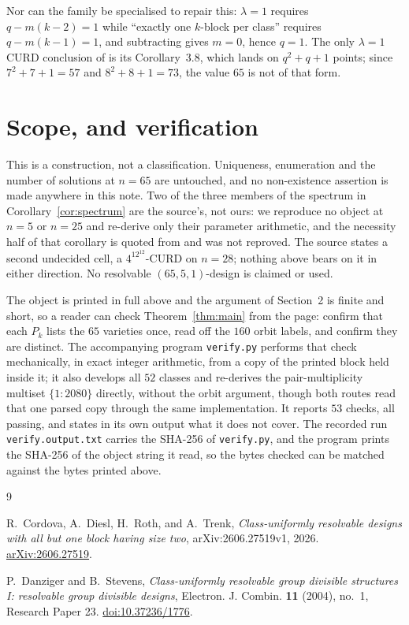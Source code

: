 \documentclass[11pt]{amsart}
\theoremstyle{remark}
\begin{document}
\noindent
Nor can the family be specialised to repair this: $\lambda=1$ requires
$q-m(k-2)=1$ while ``exactly one $k$-block per class'' requires
$q-m(k-1)=1$, and subtracting gives $m=0$, hence $q=1$. The only
$\lambda=1$ CURD conclusion of \cite{DaSt04} is its Corollary~3.8, which lands
on $q^2+q+1$ points; since $7^2+7+1=57$ and $8^2+8+1=73$, the value $65$ is not
of that form.

\section{Scope, and verification}

This is a construction, not a classification. Uniqueness, enumeration and the
number of solutions at $n=65$ are untouched, and no non-existence assertion is
made anywhere in this note. Two of the three members of the spectrum in
Corollary~\ref{cor:spectrum} are the source's, not ours: we reproduce no object
at $n=5$ or $n=25$ and re-derive only their parameter arithmetic, and the
necessity half of that corollary is quoted from \cite{CDRT} and was not
reproved. The source states a second undecided cell, a $4^12^{12}$-CURD on
$n=28$; nothing above bears on it in either direction. No resolvable
$(65,5,1)$-design is claimed or used.

The object is printed in full above and the argument of Section~2 is finite and
short, so a reader can check Theorem~\ref{thm:main} from the page: confirm that
each $P_k$ lists the $65$ varieties once, read off the $160$ orbit labels, and
confirm they are distinct. The accompanying program \texttt{verify.py} performs
that check mechanically, in exact integer arithmetic, from a copy of the printed
block held inside it; it also develops all $52$ classes and re-derives the
pair-multiplicity multiset $\{1{:}2080\}$ directly, without the orbit argument,
though both routes read that one parsed copy through the same implementation. It
reports $53$ checks, all passing, and states in its own output what it does not
cover. The recorded run \texttt{verify.output.txt} carries the SHA-256 of
\texttt{verify.py}, and the program prints the SHA-256 of the object string it
read, so the bytes checked can be matched against the bytes printed above.

\begin{thebibliography}{9}

R.~Cordova, A.~Diesl, H.~Roth, and A.~Trenk,
\emph{Class-uniformly resolvable designs with all but one block having size
two}, arXiv:2606.27519v1, 2026.
\href{https://arxiv.org/abs/2606.27519}{arXiv:2606.27519}.

P.~Danziger and B.~Stevens,
\emph{Class-uniformly resolvable group divisible structures I: resolvable group
divisible designs},
Electron. J. Combin. \textbf{11} (2004), no.~1, Research Paper 23.
\href{https://doi.org/10.37236/1776}{doi:10.37236/1776}.

\end{thebibliography}
\end{document}
